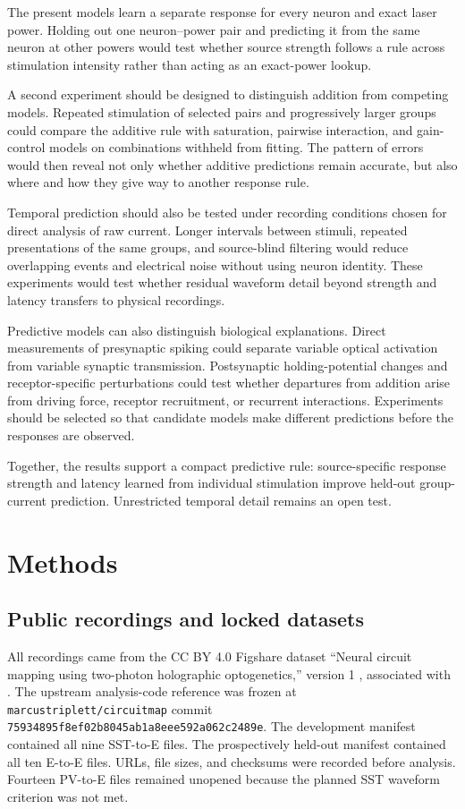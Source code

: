 \documentclass[10pt,twocolumn]{article}
\begin{document}
The present models learn a separate response for every neuron and exact laser
power. Holding out one neuron--power pair and predicting it from the same
neuron at other powers would test whether source strength follows a rule
across stimulation intensity rather than acting as an exact-power lookup.

A second experiment should be designed to distinguish addition from competing
models. Repeated stimulation of selected pairs and progressively larger groups
could compare the additive rule with saturation, pairwise interaction, and
gain-control models on combinations withheld from fitting. The pattern of
errors would then reveal not only whether additive predictions remain accurate,
but also where and how they give way to another response rule.

Temporal prediction should also be tested under recording conditions chosen
for direct analysis of raw current. Longer intervals between stimuli, repeated
presentations of the same groups, and source-blind filtering would reduce
overlapping events and electrical noise without using neuron identity. These
experiments would test whether residual waveform detail beyond strength and
latency transfers to physical recordings.

Predictive models can also distinguish biological explanations.
Direct measurements of presynaptic spiking could separate variable optical
activation from variable synaptic transmission. Postsynaptic holding-potential
changes and receptor-specific perturbations could test whether departures from
addition arise from driving force, receptor recruitment, or recurrent
interactions. Experiments should be selected so that candidate models make
different predictions before the responses are observed.

Together, the results support a compact predictive rule: source-specific
response strength and latency learned from individual stimulation improve
held-out group-current prediction. Unrestricted temporal detail remains an
open test.

\section{Methods}

\subsection{Public recordings and locked datasets}

All recordings came from the CC BY 4.0 Figshare dataset
``Neural circuit mapping using two-photon holographic optogenetics,''
version 1 \citep{gajowa2025dataset}, associated with
\citet{triplett2025rapid}. The upstream analysis-code reference was frozen at
\texttt{marcustriplett/circuitmap} commit
\texttt{75934895f8ef02b8045ab1a8eee592a062c2489e}.
The development manifest contained all nine SST-to-E files. The prospectively
held-out manifest contained all ten E-to-E files. URLs, file sizes, and checksums
were recorded before analysis. Fourteen PV-to-E files remained unopened
because the planned SST waveform criterion was not met.
\end{document}
